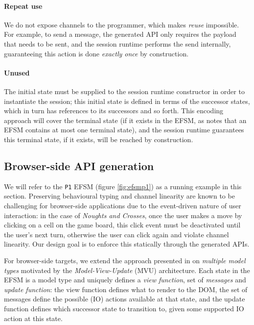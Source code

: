 \documentclass[submission,copyright,creativecommons]{eptcs}
\begin{document}
\paragraph{Repeat use} We do not expose channels to the programmer, which makes \textit{reuse} impossible. For example, to send a message, the generated API only requires the payload that needs to be sent, and the session runtime performs the send internally, guaranteeing this action is done \textit{exactly once} by construction.

\paragraph{Unused} The initial state must be supplied to the session runtime constructor in order to instantiate the session; this initial state is defined in terms of the successor states, which in turn has references to its successors and so forth. This encoding approach will cover the terminal state (if it exists in the EFSM, as \cite{Hybrid2016} notes that an EFSM contains at most one terminal state), and the session runtime guarantees this terminal state, if it exists, will be reached by construction. 

\subsection{Browser-side API generation}
\label{section:browser}

We will refer to the \texttt{P1} EFSM (figure \ref{fig:efsmp1}) as a
running example in this section. Preserving behavioural typing and
channel linearity are known to be challenging for browser-side
applications due to the event-driven nature of user interaction: in
the case of \textit{Noughts and Crosses}, once the user makes a move
by clicking on a cell on the game board, this click event must be
deactivated until the user's next turn, otherwise the user can click
again and violate channel linearity. Our design goal is to enforce
this statically through the generated APIs. 

For browser-side targets, we extend the approach presented in \cite{MVU2019} on \textit{multiple model types} motivated by the \textit{Model-View-Update} (MVU) architecture. Each state in the EFSM is a model type and uniquely defines a \textit{view function}, set of \textit{messages} and \textit{update function}: the view function defines what to render to the DOM, the set of messages define the possible (IO) actions available at that state, and the update function defines which successor state to transition to, given some supported IO action at this state.
\end{document}
